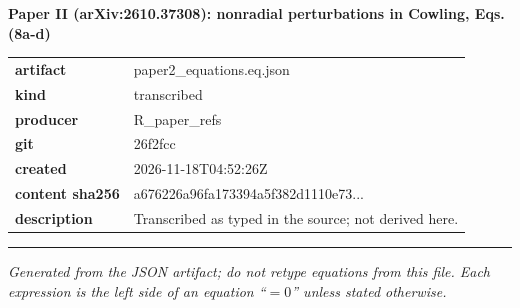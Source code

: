 \documentclass[10pt,a4paper]{article}
\begin{document}
{\Large\bfseries Paper II (arXiv:2610.37308): nonradial perturbations in Cowling, Eqs. (8a-d)}\par
\smallskip
\begin{tabular}{@{}lp{}@{}}\textbf{artifact} & paper2\_equations.eq.json\\\textbf{kind} & transcribed\\\textbf{producer} & R\_paper\_refs\\\textbf{git} & 26f2fcc\\\textbf{created} & 2026-11-18T04:52:26Z\\\textbf{content sha256} & a676226a96fa173394a5f382d1110e73...\\\textbf{description} & Transcribed as typed in the source; not derived here.\\\end{tabular}
\par\medskip\hrule\medskip

\textit{Generated from the JSON artifact; do not retype equations from this file. Each expression is the left side of an equation ``$= 0$'' unless stated otherwise.}\par
\end{document}
